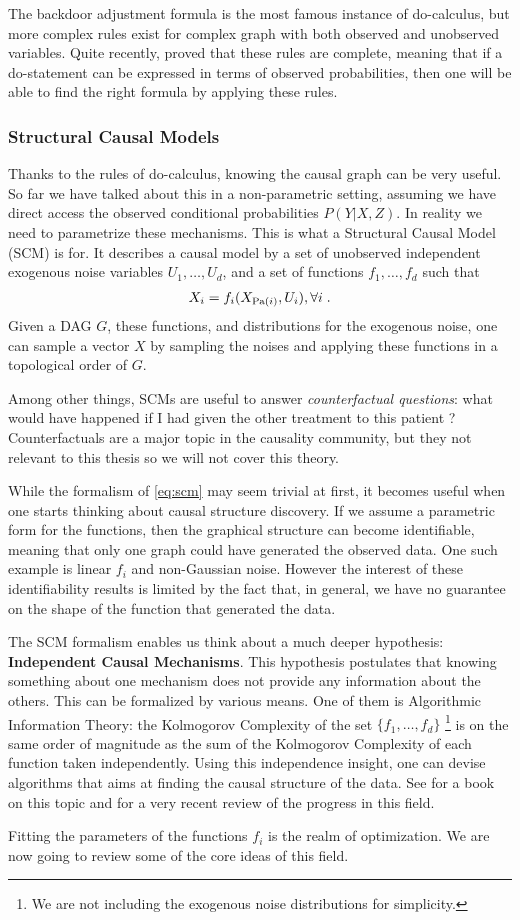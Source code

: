 The backdoor adjustment formula is the most famous instance of do-calculus, but more complex rules exist for complex graph with both observed and unobserved variables. Quite recently, \citet{huang2012pearl} proved that these rules are complete, meaning that if a do-statement can be expressed in terms of observed probabilities, then one will be able to find the right formula by applying these rules. 


\subsubsection{Structural Causal Models}

Thanks to the rules of do-calculus, knowing the causal graph can be very useful. So far we have talked about this in a non-parametric setting, assuming we have direct access the observed conditional probabilities $P(Y|X, Z)$. In reality we need to parametrize these mechanisms. This is what a Structural Causal Model (SCM) is for. It describes a causal model by a set of unobserved independent exogenous noise variables $U_1, \dots, U_d$, and a set of functions $f_1, \dots, f_d$ such that
\begin{align}
    X_i = f_i(X_{\operatorname{\mathrm{Pa}}(i)}, U_i), \forall i \;.
    \label{eq:scm}
\end{align}
Given a DAG $G$, these functions, and distributions for the exogenous noise, one can sample a vector $X$ by sampling the noises and applying these functions in a topological order of $G$.

Among other things, SCMs are useful to answer \textit{counterfactual questions}: what would have happened if I had given the other treatment to this patient ?  Counterfactuals are a major topic in the causality community, but they not relevant to this thesis so we will not cover this theory.

While the formalism of \eqref{eq:scm} may seem trivial at first, it becomes useful when one starts thinking about causal structure discovery. 
If we assume a parametric form for the functions, then the graphical structure can become identifiable, meaning that only one graph could have generated the observed data. One such example is linear $f_i$ and non-Gaussian noise. 
However the interest of these identifiability results is limited by the fact that, in general, we have no guarantee on the shape of the function that generated the data. 

The SCM formalism enables us think about a much deeper hypothesis: \textbf{Independent Causal Mechanisms}. This hypothesis postulates that knowing something about one mechanism does not provide any information about the others. This can be formalized by various means. One of them is Algorithmic Information Theory: the Kolmogorov Complexity of the set $\{ f_1, \dots, f_d \}$
\footnote{We are not including the exogenous noise distributions for simplicity.}
is on the same order of magnitude as the sum of the Kolmogorov Complexity of each function taken independently. 
Using this independence insight, one can devise algorithms that aims at finding the causal structure of the data. See \citet{peters2017elements} for a book on this topic and \citet{scholkopf2019causality} for a very recent review of the progress in this field. 

Fitting the parameters of the functions $f_i$ is the realm of optimization. We are now going to review some of the core ideas of this field.
